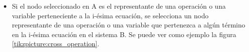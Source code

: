 \begin{itemize}
    \item Si el nodo seleccionado en A es el representante de una operación o una variable perteneciente a la i-ésima ecuación, se selecciona un nodo representante de una operación o una variable que pertenezca a algún término en la i-ésima ecuación en el sistema B. Se puede ver como ejemplo la figura \ref{tikzpicture:cross_operation}.

          \begin{center}




\end{center}
\end{itemize}
